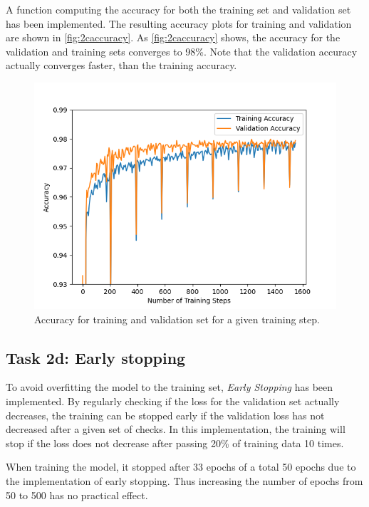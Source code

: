 \documentclass{article}
\begin{document}
A function computing the accuracy for both the training set and validation set has been implemented. The resulting accuracy plots for training and validation are shown in \autoref{fig:2caccuracy}. As \autoref{fig:2caccuracy} shows, the accuracy for the validation and training sets converges to 98\%. Note that the validation accuracy actually converges faster, than the training accuracy.   
 
\begin{figure}[H]
    \centering
    \includegraphics[width = \textwidth]{Assignment_1/Assignments/plots/task2abc/task2c_binary_train_accuracy.png}
    \caption{Accuracy for training and validation set for a given training step.}
    \label{fig:2caccuracy}
\end{figure}

\subsection{Task 2d: Early stopping}

To avoid overfitting the model to the training set, \textit{Early Stopping} has been implemented. By regularly checking if the loss for the validation set actually decreases, the training can be stopped early if the  validation loss has not decreased after a given set of checks. In this implementation, the training will stop if the loss does not decrease after passing 20\% of training data 10 times.

When training the model, it stopped after 33 epochs of a total 50 epochs due to the implementation of early stopping. Thus increasing the number of epochs from 50 to 500 has no practical effect.
\end{document}
